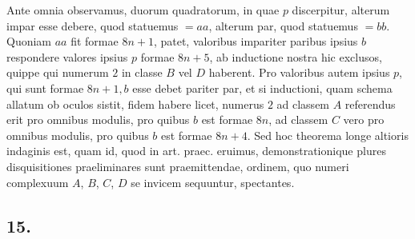 \documentclass[twoside,12pt, showframe]{memoir}
\begin{document}
Ante omnia observamus, duorum quadratorum, in quae \(p\) discerpitur, alterum impar esse debere, quod statuemus \(=a a\), alterum par, quod statuemus \(=b b\). Quoniam \(a {a}\) fit formae \(8 n+1\), patet, valoribus impariter paribus ipsius \(b\) respondere valores ipsius \(p\) formae \(8 n+5\), ab inductione nostra hic exclusos, quippe qui numerum \(2\) in classe \(B\) vel \(D\) haberent. Pro valoribus autem ipsius \(p\), qui sunt formae \(8 n+1, b\) esse debet pariter par, et si inductioni, quam schema allatum ob oculos sistit, fidem habere licet, numerus \(2\) ad classem \(A\) referendus erit pro omnibus modulis, pro quibus \(b\) est formae \(8 n\), ad classem \(C\) vero pro omnibus modulis, pro quibus \(b\) est formae \(8 n+4\). Sed hoc theorema longe altioris indaginis est, quam id, quod in art. praec. eruimus, demonstrationique plures disquisitiones praeliminares sunt praemittendae, ordinem, quo numeri complexuum \(A\), \(B\), \(C\), \(D\) se invicem sequuntur, spectantes.

\subsection*{15.}
 
\end{document}
